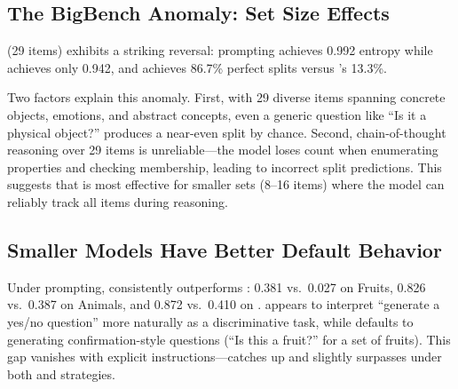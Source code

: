 \subsection{The BigBench Anomaly: Set Size Effects}
\label{sec:setsize}

\bigbench (29 items) exhibits a striking reversal: \basic prompting achieves 0.992 entropy while \chainofthought achieves only 0.942, and \explicit achieves 86.7\% perfect splits versus \chainofthought's 13.3\%.

Two factors explain this anomaly.
First, with 29 diverse items spanning concrete objects, emotions, and abstract concepts, even a generic question like ``Is it a physical object?'' produces a near-even split by chance.
Second, chain-of-thought reasoning over 29 items is unreliable---the model loses count when enumerating properties and checking membership, leading to incorrect split predictions.
This suggests that \chainofthought is most effective for smaller sets (8--16 items) where the model can reliably track all items during reasoning.

\subsection{Smaller Models Have Better Default Behavior}

Under \basic prompting, \gptmini consistently outperforms \gptfull: 0.381 vs.\ 0.027 on Fruits, 0.826 vs.\ 0.387 on Animals, and 0.872 vs.\ 0.410 on \things.
\gptmini appears to interpret ``generate a yes/no question'' more naturally as a discriminative task, while \gptfull defaults to generating confirmation-style questions (\eg ``Is this a fruit?'' for a set of fruits).
This gap vanishes with explicit instructions---\gptfull catches up and slightly surpasses \gptmini under both \explicit and \chainofthought strategies.
